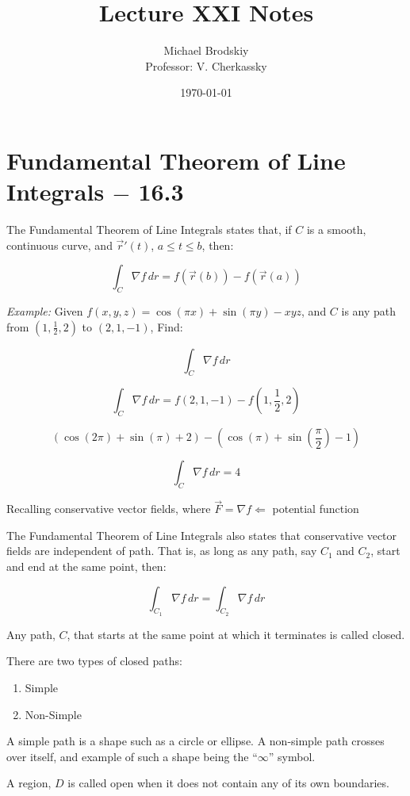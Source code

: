 \documentclass[12pt]{article}
\title{Lecture XXI Notes}
\date{\today}
\author{Michael Brodskiy\\ \small Professor: V. Cherkassky}
\begin{document}
\maketitle

\section{Fundamental Theorem of Line Integrals $-$ 16.3}

The Fundamental Theorem of Line Integrals states that, if $C$ is a smooth, continuous curve, and $\overrightarrow{r}'(t)$, $a\leq t\leq b$, then:

$$\int_C \nabla f\,dr=f(\overrightarrow{r}(b))-f(\overrightarrow{r}(a))$$

\textit{Example:} Given $f(x,y,z)=\cos(\pi x)+\sin(\pi y)-xyz$, and $C$ is any path from $(1,\frac{1}{2}, 2)$ to $(2,1,-1)$, Find:

$$\int_C \nabla f\,dr$$

$$\int_C \nabla f\,dr=f(2,1,-1)-f(1,\frac{1}{2},2)$$

$$(\cos(2\pi)+\sin(\pi)+2)-(\cos(\pi)+\sin(\frac{\pi}{2})-1)$$

$$\int_C \nabla f\,dr=4$$

Recalling conservative vector fields, where $\overrightarrow{F}=\nabla f \Leftarrow$ potential function  

The Fundamental Theorem of Line Integrals also states that conservative vector fields are independent of path. That is, as long as any path, say $C_1$ and $C_2$, start and end at the same point, then:

$$\int_{C_1} \nabla f\,dr=\int_{C_2} \nabla f\,dr$$

Any path, $C$, that starts at the same point at which it terminates is called closed.

There are two types of closed paths:

\begin{enumerate}

  \item Simple

  \item Non-Simple

\end{enumerate}

A simple path is a shape such as a circle or ellipse. A non-simple path crosses over itself, and example of such a shape being the ``$\infty$'' symbol.

A region, $D$ is called open when it does not contain any of its own boundaries.
\end{document}
